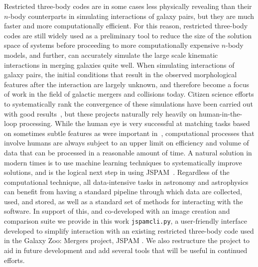Restricted three-body codes are in some cases less physically revealing
than their $n$-body counterparts in simulating interactions of galaxy pairs,
but they are much faster and more computationally efficient.
For this reason, restricted three-body codes are still widely used as a
preliminary tool to reduce the size of the solution space
of systems before proceeding to more computationally expensive
$n$-body models, and further, can accurately simulate the large
scale kinematic interactions in merging galaxies quite well.
When simulating interactions of galaxy pairs, the initial
conditions that result in the observed morphological features after the
interaction are largely unknown, and therefore become a focus
of work in the field of galactic mergers and collisions today.
Citizen science efforts to systematically rank the convergence of these
simulations have been carried out with good results~\cite{Holincheck2015},
but these projects naturally rely heavily on human-in-the-loop processing.
While the human eye is very successful at matching tasks based on
sometimes subtle features as were important in~\citet{Holincheck2015},
computational processes that involve humans are always subject to an upper
limit on efficiency and volume of data that can be processed in a reasonable
amount of time.
A natural solution in modern times is to use machine learning techniques to
systematically improve solutions, and is the
logical next step in using JSPAM~\citet{Wallin2016}.
Regardless of the computational technique, all data-intensive tasks in
astronomy and astrophysics can benefit from having a standard pipeline through
which data are collected, used, and stored, as well as a standard set of
methods for interacting with the software. In support of this, and co-developed
with an image creation and comparison suite we provide in
this work \texttt{jspamcli.py}, a user-friendly interface developed to
simplify interaction with an
existing restricted three-body code used in the Galaxy Zoo: Mergers project,
JSPAM \cite{Wallin2016}.
We also restructure the project to aid in future development and add several
tools that will be useful in continued efforts.
